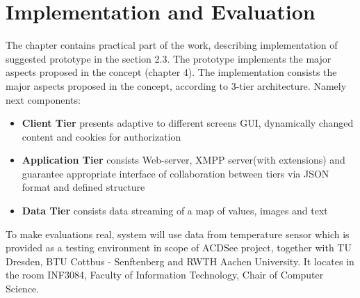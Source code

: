 \chapter{Implementation and Evaluation}
	The chapter contains practical part of the work, describing implementation of suggested prototype in the section
	2.3. The prototype implements the major aspects proposed in the concept (chapter 4).
	The implementation consists the major aspects proposed in the concept, according to 3-tier architecture. Namely next components:
	 \begin{itemize}
		\item \textbf{Client Tier} presents adaptive to different screens GUI, dynamically changed content and cookies for authorization
		\item \textbf{Application Tier} consists Web-server, XMPP server(with extensions) and guarantee appropriate interface of collaboration between tiers via JSON format and defined structure
		\item \textbf{Data Tier} consists data streaming of a map of values, images and text
	\end{itemize}
	To make evaluations real, system will use data from temperature sensor which is provided as a testing environment in scope of ACDSee project, together with TU Dresden, BTU Cottbus - Senftenberg and RWTH Aachen University. It locates in the room INF3084, Faculty of Information Technology, Chair of Computer Science.


